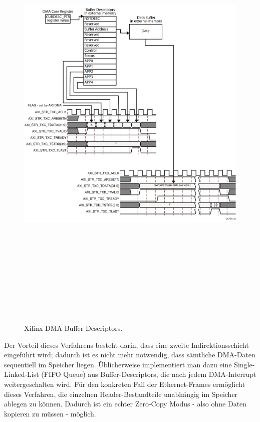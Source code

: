 \documentclass[letterpaper,11pt]{article}
\begin{document}
\begin{onehalfspace}
\begin{figure}
\centering
\includegraphics [width = 16cm,height=22cm] {ds759_axi_ethernet_075.png}
\caption{Xilinx DMA Buffer Descriptors.\label{fig:dma}}
\end{figure}

\noindent Der Vorteil dieses Verfahrens besteht darin, dass eine zweite
Indirektionsschicht eingeführt wird; dadurch ist es nicht mehr
notwendig, dass sämtliche DMA-Daten sequentiell im Speicher liegen.
Üblicherweise implementiert man dazu eine Single-Linked-List (FIFO
Queue) aus Buffer-Descriptors, die nach jedem DMA-Interrupt
weitergeschalten wird. Für den konkreten Fall der Ethernet-Frames
ermöglicht dieses Verfahren, die einzelnen Header-Bestandteile
unabhängig im Speicher ablegen zu können. Dadurch ist ein echter
Zero-Copy Modus - also ohne Daten kopieren zu müssen - möglich.


\end{onehalfspace}
\end{document}
